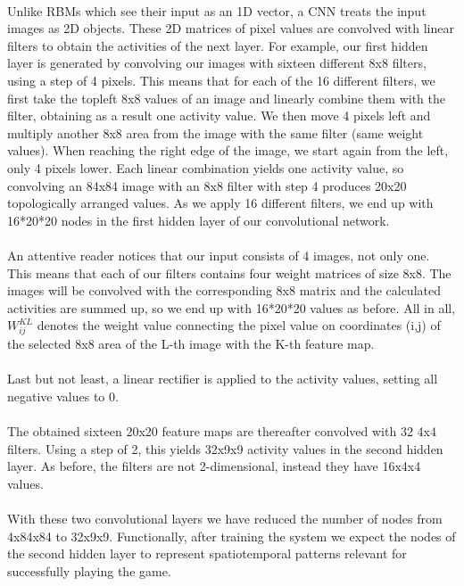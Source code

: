 \documentclass[a4paper,12pt]{article}
\begin{document}
\paragraph{}
Unlike RBMs which see their input as an 1D vector, a CNN treats the input images as 2D objects. These 2D matrices of pixel values are convolved with linear filters to obtain the activities of the next layer. For example, our first hidden layer is generated by convolving our images with sixteen different 8x8 filters, using a step of 4 pixels. This means that for each of the 16 different filters, we first take the topleft 8x8 values of an image and linearly combine them with the filter, obtaining as a result one activity value. We then move 4 pixels left and multiply another 8x8 area from the image with the same filter (same weight values). When reaching the right edge of the image, we start again from the left, only 4 pixels lower. Each linear combination yields one activity value, so convolving an 84x84 image with an 8x8 filter with step 4 produces 20x20 topologically arranged values. As we apply 16 different filters, we end up with 16*20*20 nodes in the first hidden layer of our convolutional network.
\paragraph{}
An attentive reader notices that our input consists of 4 images, not only one. This means that each of our filters contains four weight matrices of size 8x8. The images will be convolved with the corresponding 8x8 matrix and the calculated activities are summed up, so we end up with 16*20*20 values as before. All in all, $W^{KL}_{ij}$ denotes the weight value connecting the pixel value on coordinates (i,j) of the selected 8x8 area of the L-th image with the K-th feature map.

\paragraph{}
Last but not least, a linear rectifier is applied to the activity values, setting all negative values to 0.
\paragraph{}
The obtained sixteen 20x20 feature maps are thereafter convolved with 32 4x4 filters. Using a step of 2, this yields 32x9x9 activity values in the second hidden layer. As before, the filters are not 2-dimensional, instead they have 16x4x4 values.
\paragraph{}
With these two convolutional layers we have reduced the number of nodes from 4x84x84 to 32x9x9. Functionally, after training the system we expect the nodes of the second hidden layer to represent spatiotemporal patterns relevant for successfully playing the game.
\end{document}
